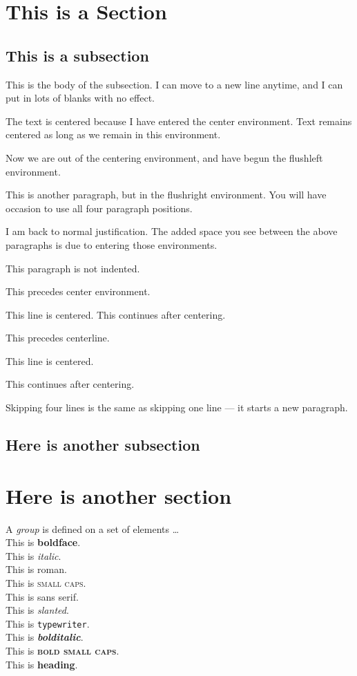 \documentclass[12pt]{article}
\begin{document}
\section{This is a Section}
\subsection{This is a subsection}
This is the body of the subsection.
I 	can move to a new line 	anytime, and I can put in lots
of blanks 	with no 	effect.

\begin{center}
	The text is centered because I have entered the center environment.
	Text remains centered as long as we remain in this environment.
\end{center}
\begin{flushleft}
	Now we are out of the centering environment, and have begun the
	flushleft environment.
\end{flushleft}
\begin{flushright}
	This is another paragraph, but in the flushright environment.
	You will have occasion to use all four paragraph positions.
\end{flushright}
I am back to normal justification. The added space you see between
the above paragraphs is due to entering those environments.	

\noindent This paragraph is not indented.

This precedes center environment.
\begin{center} This line is centered.
	This continues after centering.
\end{center}
This precedes centerline.
\centerline{This line is centered.}
This continues after centering.




Skipping four lines is the same as skipping one line
--- it starts a new paragraph.
\subsection{Here is another subsection}
\section{Here is another section}

A \textit{group} is defined on a set of elements \dots
\\
This is \textbf{boldface}. \\
This is \textit{italic}. \\
This is \textrm{roman}. \\
This is \textsc{small caps}. \\
This is \textsf{sans serif}. \\
This is \textsl{slanted}. \\
This is \texttt{typewriter}. \\
This is \textbf{\textit{bolditalic}}. \\
This is \textbf{\textsc{bold small caps}}. \\
This is {\Large\textbf{heading}}.\\
\end{document}
